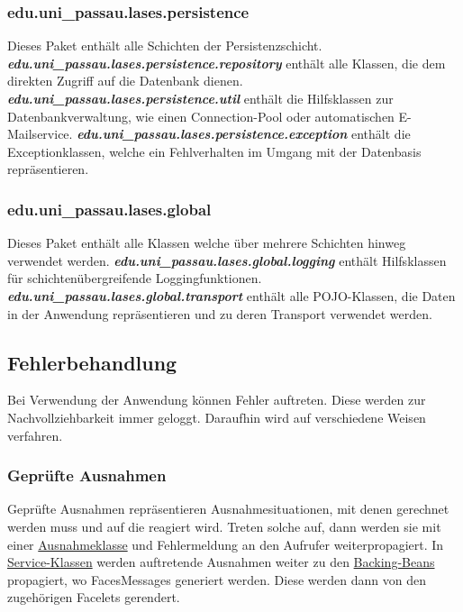 \subsubsection{edu.uni\_passau.lases.persistence}\label{arch:persistence}
Dieses Paket enthält alle Schichten der Persistenzschicht.
\newline\newline
\textbf{\emph{edu.uni\_passau.lases.persistence.repository}}\label{arch:repository}
enthält alle Klassen, die dem direkten Zugriff auf die Datenbank dienen.
\newline\newline
\textbf{\emph{edu.uni\_passau.lases.persistence.util}}
enthält die Hilfsklassen zur Datenbankverwaltung, wie einen
Connection-Pool oder automatischen E-Mailservice.
\newline\newline
\textbf{\emph{edu.uni\_passau.lases.persistence.exception}}
enthält die Exceptionklassen, welche ein Fehlverhalten im Umgang mit der
Datenbasis repräsentieren.

\subsubsection{edu.uni\_passau.lases.global}
Dieses Paket enthält alle Klassen welche über mehrere Schichten hinweg
verwendet werden.
\newline\newline
\textbf{\emph{edu.uni\_passau.lases.global.logging}}
enthält Hilfsklassen für schichtenübergreifende Loggingfunktionen.
\newline\newline
\textbf{\emph{edu.uni\_passau.lases.global.transport}}\label{arch:transport}
enthält alle POJO-Klassen, die Daten in der Anwendung repräsentieren und zu deren
Transport verwendet werden.


\subsection{Fehlerbehandlung}
Bei Verwendung der Anwendung können Fehler auftreten. Diese werden zur Nachvollziehbarkeit
immer geloggt. Daraufhin wird auf verschiedene Weisen verfahren.

\subsubsection{Geprüfte Ausnahmen}
Geprüfte Ausnahmen repräsentieren Ausnahmesituationen, mit
denen gerechnet werden muss und auf die reagiert wird.
Treten solche auf, dann werden sie mit einer
\hyperref[arch:busex]{Ausnahmeklasse} und Fehlermeldung
an den Aufrufer weiterpropagiert.
In \hyperref[arch:service]{Service-Klassen} werden auftretende Ausnahmen weiter zu den
\hyperref[arch:backing]{Backing-Beans} propagiert, wo FacesMessages %
generiert werden.
Diese werden dann von den zugehörigen Facelets %
gerendert.

